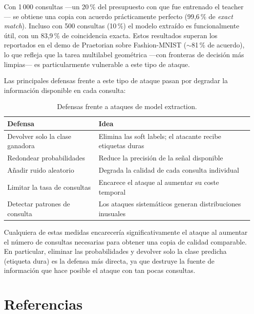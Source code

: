 \documentclass[11pt,a4paper]{article}
\begin{document}
Con 1\,000 consultas —un 20\,\% del presupuesto con que fue entrenado el teacher— se obtiene una copia con acuerdo prácticamente perfecto (99,6\,\% de \textit{exact match}). Incluso con 500 consultas (10\,\%) el modelo extraído es funcionalmente útil, con un 83,9\,\% de coincidencia exacta. Estos resultados superan los reportados en el demo de Praetorian sobre Fashion-MNIST ($\sim$81\,\% de acuerdo), lo que refleja que la tarea multilabel geométrica —con fronteras de decisión más limpias— es particularmente vulnerable a este tipo de ataque.

Las principales defensas frente a este tipo de ataque pasan por degradar la información disponible en cada consulta:

\begin{table}[h]
  \centering
  \begin{tabular}{ll}
    \toprule
    \textbf{Defensa} & \textbf{Idea} \\
    \midrule
    Devolver solo la clase ganadora  & Elimina las soft labels; el atacante recibe etiquetas duras \\
    Redondear probabilidades         & Reduce la precisión de la señal disponible \\
    Añadir ruido aleatorio           & Degrada la calidad de cada consulta individual \\
    Limitar la tasa de consultas     & Encarece el ataque al aumentar su coste temporal \\
    Detectar patrones de consulta    & Los ataques sistemáticos generan distribuciones inusuales \\
    \bottomrule
  \end{tabular}
  \caption{Defensas frente a ataques de model extraction.}
\end{table}

Cualquiera de estas medidas encarecería significativamente el ataque al aumentar el número de consultas necesarias para obtener una copia de calidad comparable. En particular, eliminar las probabilidades y devolver solo la clase predicha (etiqueta dura) es la defensa más directa, ya que destruye la fuente de información que hace posible el ataque con tan pocas consultas.

\section*{Referencias}
\end{document}
